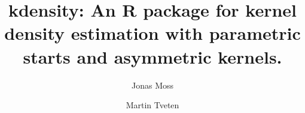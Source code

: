 \documentclass{standalone}
\begin{document}
\author
{
    Jonas Moss \and Martin Tveten
}
\title{kdensity: An R package for kernel
density estimation with parametric starts and asymmetric kernels.}
\swmaketitle

\end{document}
